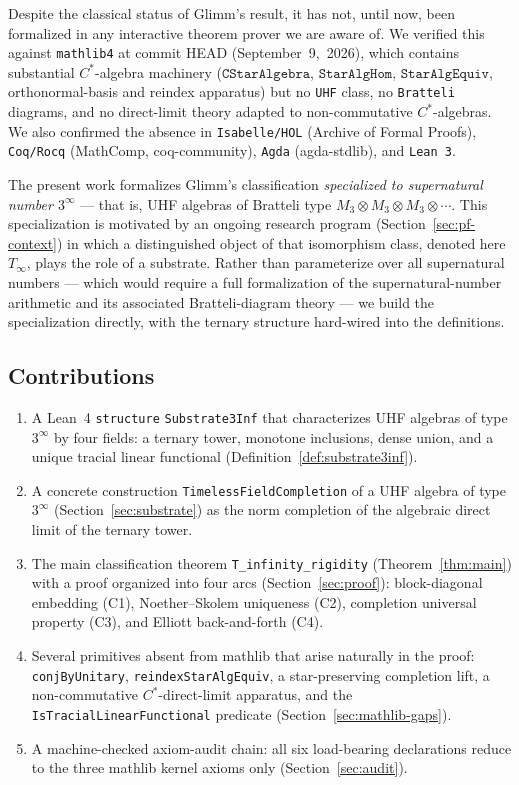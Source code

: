 \documentclass[11pt,a4paper]{article}
\theoremstyle{plain}
\theoremstyle{definition}
\begin{document}
Despite the classical status of Glimm's result, it has not, until now, been formalized in any interactive theorem prover we are aware of. We verified this against \texttt{mathlib4} at commit HEAD (September~9,~2026), which contains substantial $C^{\ast}$-algebra machinery ($\texttt{CStarAlgebra}$, $\texttt{StarAlgHom}$, $\texttt{StarAlgEquiv}$, orthonormal-basis and reindex apparatus) but no \texttt{UHF} class, no \texttt{Bratteli} diagrams, and no direct-limit theory adapted to non-commutative $C^{\ast}$-algebras. We also confirmed the absence in \texttt{Isabelle/HOL} (Archive of Formal Proofs), \texttt{Coq/Rocq} (MathComp, coq-community), \texttt{Agda} (agda-stdlib), and \texttt{Lean~3}.

The present work formalizes Glimm's classification \emph{specialized to supernatural number $3^{\infty}$} --- that is, UHF algebras of Bratteli type $M_3 \otimes M_3 \otimes M_3 \otimes \cdots$. This specialization is motivated by an ongoing research program (Section~\ref{sec:pf-context}) in which a distinguished object of that isomorphism class, denoted here $T_{\infty}$, plays the role of a substrate. Rather than parameterize over all supernatural numbers --- which would require a full formalization of the supernatural-number arithmetic and its associated Bratteli-diagram theory --- we build the specialization directly, with the ternary structure hard-wired into the definitions.

\subsection*{Contributions}
\begin{enumerate}[leftmargin=*]
  \item A Lean~4 \texttt{structure} \texttt{Substrate3Inf} that characterizes UHF algebras of type $3^{\infty}$ by four fields: a ternary tower, monotone inclusions, dense union, and a unique tracial linear functional (Definition~\ref{def:substrate3inf}).
  \item A concrete construction \texttt{TimelessFieldCompletion} of a UHF algebra of type $3^{\infty}$ (Section~\ref{sec:substrate}) as the norm completion of the algebraic direct limit of the ternary tower.
  \item The main classification theorem \texttt{T\_infinity\_rigidity} (Theorem~\ref{thm:main}) with a proof organized into four arcs (Section~\ref{sec:proof}): block-diagonal embedding (C1), Noether--Skolem uniqueness (C2), completion universal property (C3), and Elliott back-and-forth (C4).
  \item Several primitives absent from mathlib that arise naturally in the proof: \texttt{conjByUnitary}, \texttt{reindexStarAlgEquiv}, a star-preserving completion lift, a non-commutative $C^{\ast}$-direct-limit apparatus, and the \texttt{IsTracialLinearFunctional} predicate (Section~\ref{sec:mathlib-gaps}).
  \item A machine-checked axiom-audit chain: all six load-bearing declarations reduce to the three mathlib kernel axioms only (Section~\ref{sec:audit}).
\end{enumerate}
\end{document}
